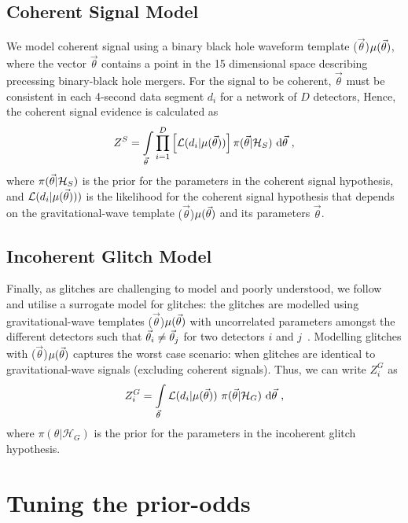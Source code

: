 \documentclass[%
 nofootinbib,
 amsmath,amssymb,
 aps,
 twocolumn
]{revtex4-2}
\newcommand{\mathcmd}[1]{{\sc \relax\ifmmode#1\else $#1$\fi}\xspace}
\newcommand{\parameters}{\mathcmd{\vec{\theta}}}
\newcommand{\template}{\mathcmd{\mu(\parameters)}}
\begin{document}
\subsection{Coherent Signal Model}
We model coherent signal using a binary black hole waveform template \template, where the vector \parameters contains a point in the 15 dimensional space describing precessing binary-black hole mergers. For the signal to be coherent, \parameters must be consistent in each 4-second data segment $d_i$ for a network of $D$ detectors, Hence, the coherent signal evidence is calculated as
\begin{equation}
\label{eq:zs}
Z^S = \int\limits_{\parameters} \prod\limits^{D}_{i=1} \left[ \mathcal{L}(d_i|\template)\right] \pi(\parameters | \mathcal{H}_S)\  \text{d}\parameters \ ,
\end{equation}
where $\pi(\parameters| \mathcal{H}_S)$ is the prior for the parameters in the coherent signal hypothesis, and $\mathcal{L}(d_i|\template))$ is the likelihood for the coherent signal hypothesis that depends on the gravitational-wave template \template and its parameters \parameters. 

\subsection{Incoherent Glitch Model}
Finally, as glitches are challenging to model and poorly understood, we follow \citet{bci} and utilise a surrogate model for glitches: the glitches are modelled using gravitational-wave templates  \template with uncorrelated  parameters amongst the different detectors such that  $\parameters_i \neq \parameters_j$ for two detectors $i$ and $j$~\cite{bci}.  Modelling glitches with \template captures the worst case scenario: when glitches are identical to gravitational-wave signals (excluding coherent signals). Thus, we can write $Z^G_i$ as 
\begin{equation}
\label{eq:zg}
Z^G_i = \int\limits_{\parameters} \mathcal{L}(d_i|\template)\ \pi(\parameters| \mathcal{H}_G)\  \text{d}\parameters  \ ,
\end{equation}
where $\pi(\theta| \mathcal{H}_G)$ is the prior for the parameters in the incoherent glitch hypothesis. 



\section{Tuning the prior-odds}\label{sec:tuning-prior-odds}
\end{document}
